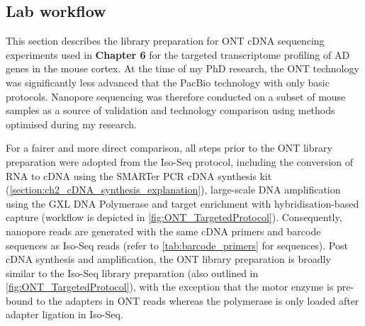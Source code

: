 \clearpage
\subsection{Lab workflow}
\label{chap:ont_labpipeline}
This section describes the library preparation for ONT cDNA sequencing experiments used in \textbf{Chapter 6} for the targeted transcriptome profiling of AD genes in the mouse cortex. At the time of my PhD research, the ONT technology was significantly less advanced that the PacBio technology with only basic protocols. Nanopore sequencing was therefore conducted on a subset of mouse samples as a source of validation and technology comparison using methods optimised during my research. 

For a fairer and more direct comparison, all steps prior to the ONT library preparation were adopted from the Iso-Seq protocol, including the conversion of RNA to cDNA using the SMARTer PCR cDNA synthesis kit (\cref{section:ch2_cDNA_synthesis_explanation}), large-scale DNA amplification using the GXL DNA Polymerase and target enrichment with hybridisation-based capture (workflow is depicted in \cref{fig:ONT_TargetedProtocol}). Consequently, nanopore reads are generated with the same cDNA primers and barcode sequences as Iso-Seq reads (refer to \cref{tab:barcode_primers} for sequences). Post cDNA synthesis and amplification, the ONT library preparation is broadly similar to the Iso-Seq library preparation (also outlined in \cref{fig:ONT_TargetedProtocol}), with the exception that the motor enzyme is pre-bound to the adapters in ONT reads whereas the polymerase is only loaded after adapter ligation in Iso-Seq.  

